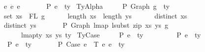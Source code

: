 \begin{isabellebody}
\ \ \ \ \ e{}\ {\isasymsimeq}e\ e{}\ {\isacharequal}{\kern0pt}{\isacharequal}{\kern0pt}{\isachargreater}{\kern0pt}\isanewline
\ \ \ \ \ {\isasymGamma}\ {\isasymturnstile}{\isacharbraceleft}{\kern0pt}P{\isacharbraceright}{\kern0pt}\ e{}\ {\isacharcolon}{\kern0pt}\ ty{\isachardoublequoteclose}\isanewline
{\isacharbar}{\kern0pt}\ TyAlpha{\isacharcolon}{\kern0pt}\isanewline
\ \ \ \ {\isachardoublequoteopen}{\isasymGamma}{}\ {\isasymturnstile}{\isacharbraceleft}{\kern0pt}P{\isacharbraceright}{\kern0pt}\ Graph\ g\ {\isacharcolon}{\kern0pt}\ ty\ {\isacharequal}{\kern0pt}{\isacharequal}{\kern0pt}{\isachargreater}{\kern0pt}\isanewline
\ \ \ \ \ set\ xs\ {\isacharequal}{\kern0pt}\ FL\ g\ {\isacharequal}{\kern0pt}{\isacharequal}{\kern0pt}{\isachargreater}{\kern0pt}\isanewline
\ \ \ \ \ length\ xs\ {\isacharequal}{\kern0pt}\ length\ ys\ {\isacharequal}{\kern0pt}{\isacharequal}{\kern0pt}{\isachargreater}{\kern0pt}\isanewline
\ \ \ \ \ distinct\ xs\ {\isacharequal}{\kern0pt}{\isacharequal}{\kern0pt}{\isachargreater}{\kern0pt}\isanewline
\ \ \ \ \ distinct\ ys\ {\isacharequal}{\kern0pt}{\isacharequal}{\kern0pt}{\isachargreater}{\kern0pt}\isanewline
\ \ \ \ \ {\isasymGamma}{}\ {\isasymturnstile}{\isacharbraceleft}{\kern0pt}P{\isacharbraceright}{\kern0pt}\ Graph\ {\isacharparenleft}{\kern0pt}lmap\ {\isacharparenleft}{\kern0pt}lsubst\ {\isacharparenleft}{\kern0pt}zip\ xs\ ys{\isacharparenright}{\kern0pt}{\isacharparenright}{\kern0pt}\ g{\isacharparenright}{\kern0pt}\isanewline
\ \ \ \ \ \ \ \ \ {\isacharcolon}{\kern0pt}\ lmap{\isacharunderscore}{\kern0pt}ty\ xs\ ys\ ty{\isachardoublequoteclose}\isanewline
{\isacharbar}{\kern0pt}\ TyCase{\isacharcolon}{\kern0pt}\isanewline
\ \ \ \ {\isachardoublequoteopen}{\isasymGamma}\ {\isasymturnstile}{\isacharbraceleft}{\kern0pt}P{\isacharbraceright}{\kern0pt}\ e{}\ {\isacharcolon}{\kern0pt}\ ty{}\ {\isacharequal}{\kern0pt}{\isacharequal}{\kern0pt}{\isachargreater}{\kern0pt}\isanewline
\ \ \ \ \ {\isasymGamma}{}\ {\isacharat}{\kern0pt}\ {\isasymGamma}\ {\isasymturnstile}{\isacharbraceleft}{\kern0pt}P{\isacharbraceright}{\kern0pt}\ e{}\ {\isacharcolon}{\kern0pt}\ ty{}\ {\isacharequal}{\kern0pt}{\isacharequal}{\kern0pt}{\isachargreater}{\kern0pt}\isanewline
\ \ \ \ \ {\isasymGamma}\ {\isasymturnstile}{\isacharbraceleft}{\kern0pt}P{\isacharbraceright}{\kern0pt}\ e{}\ {\isacharcolon}{\kern0pt}\ ty{}\ {\isacharequal}{\kern0pt}{\isacharequal}{\kern0pt}{\isachargreater}{\kern0pt}\isanewline
\ \ \ \ \ {\isasymGamma}\ {\isasymturnstile}{\isacharbraceleft}{\kern0pt}P{\isacharbraceright}{\kern0pt}\ Case\ e{}\ {\isasymGamma}{}\ T\ e{}\ e{}\ {\isacharcolon}{\kern0pt}\ ty{}{\isachardoublequoteclose}%

\end{isabellebody}
